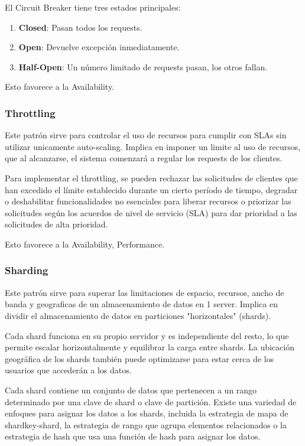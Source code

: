 \documentclass{article}
\begin{document}
		El Circuit Breaker tiene tres estados principales:
			\begin{enumerate}
				\item \textbf{Closed}: Pasan todos los requests.
				
				\item \textbf{Open}: Devuelve excepción inmediatamente.
				\item \textbf{Half-Open}: Un número limitado de	requests pasan, los otros fallan.
			
			\end{enumerate}
		
		Esto favorece a la Availability.
		
		\subsubsection{Throttling}
		Este patrón sirve para controlar el uso de recursos para cumplir con SLAs sin utilizar unicamente auto-scaling. Implica en imponer un limite al uso de recursos, que al alcanzarse, el sistema comenzará a regular los requests de los clientes.
		
		Para implementar el throttling, se pueden rechazar las solicitudes de clientes que han excedido el límite establecido durante un cierto período de tiempo, degradar o deshabilitar funcionalidades no esenciales para liberar recursos o priorizar las solicitudes según los acuerdos de nivel de servicio (SLA) para dar prioridad a las solicitudes de alta prioridad.
		
		Esto favorece a la Availability, Performance.
		
				
		\subsubsection{Sharding}\label{sec:sharding_generico}
		Este patrón sirve para superar las limitaciones de espacio, recursos, ancho de banda y geograficas de un almacenamiento de datos en 1 server. Implica en dividir el almacenamiento de datos en particiones "horizontales" (shards).
		
		Cada shard funciona en su propio servidor y es independiente del resto, lo que permite escalar horizontalmente y equilibrar la carga entre shards. La ubicación geográfica de los shards también puede optimizarse para estar cerca de los usuarios que accederán a los datos.
		
		Cada shard contiene un conjunto de datos que pertenecen a un rango determinado por una clave de shard o clave de partición. Existe una variedad de enfoques para asignar los datos a los shards, incluida la estrategia de mapa de shardkey-shard, la estrategia de rango que agrupa elementos relacionados o la estrategia de hash que usa una función de hash para asignar los datos.
		
\end{document}

